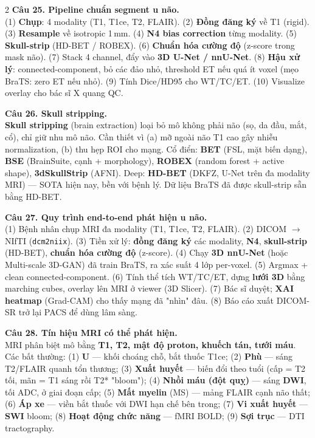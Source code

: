 \begin{paracol}{2}
\textbf{Câu 25. Pipeline chuẩn segment u não.}\\
(1) \textbf{Chụp}: 4 modality (T1, T1ce, T2, FLAIR). (2) \textbf{Đồng đăng ký} về T1 (rigid). (3) \textbf{Resample} về isotropic 1\,mm. (4) \textbf{N4 bias correction} từng modality. (5) \textbf{Skull-strip} (HD-BET / ROBEX). (6) \textbf{Chuẩn hóa cường độ} (z-score trong mask não). (7) Stack 4 channel, đẩy vào \textbf{3D U-Net / nnU-Net}. (8) \textbf{Hậu xử lý}: connected-component, bỏ các đảo nhỏ, threshold ET nếu quá ít voxel (mẹo BraTS: zero ET nếu nhỏ). (9) Tính Dice/HD95 cho WT/TC/ET. (10) Visualize overlay cho bác sĩ X quang QC.

\textbf{Câu 26. Skull stripping.}\\
\textbf{Skull stripping} (brain extraction) loại bỏ mô không phải não (sọ, da đầu, mắt, cổ), chỉ giữ nhu mô não. Cần thiết vì (a) mỡ ngoài não T1 cao gây nhiễu normalization, (b) thu hẹp ROI cho mạng. Cổ điển: \textbf{BET} (FSL, mặt biến dạng), \textbf{BSE} (BrainSuite, cạnh + morphology), \textbf{ROBEX} (random forest + active shape), \textbf{3dSkullStrip} (AFNI). Deep: \textbf{HD-BET} (DKFZ, U-Net trên đa modality MRI) — SOTA hiện nay, bền với bệnh lý. Dữ liệu BraTS đã được skull-strip sẵn bằng HD-BET.

\textbf{Câu 27. Quy trình end-to-end phát hiện u não.}\\
(1) Bệnh nhân chụp MRI đa modality (T1, T1ce, T2, FLAIR). (2) DICOM $\to$ NIfTI (\texttt{dcm2niix}). (3) Tiền xử lý: \textbf{đồng đăng ký} các modality, \textbf{N4}, \textbf{skull-strip} (HD-BET), \textbf{chuẩn hóa cường độ} (z-score). (4) Chạy \textbf{3D nnU-Net} (hoặc Multi-scale 3D-GAN) đã train BraTS, ra xác suất 4 lớp per-voxel. (5) Argmax + clean connected-component. (6) Tính thể tích WT/TC/ET, dựng \textbf{lưới 3D} bằng marching cubes, overlay lên MRI ở viewer (3D Slicer). (7) Bác sĩ duyệt; \textbf{XAI heatmap} (Grad-CAM) cho thấy mạng đã "nhìn" đâu. (8) Báo cáo xuất DICOM-SR trở lại PACS để dùng lâm sàng.

\textbf{Câu 28. Tín hiệu MRI có thể phát hiện.}\\
MRI phân biệt mô bằng \textbf{T1, T2, mật độ proton, khuếch tán, tưới máu}. Các bất thường: (1) \textbf{U} — khối choáng chỗ, bắt thuốc T1ce; (2) \textbf{Phù} — sáng T2/FLAIR quanh tổn thương; (3) \textbf{Xuất huyết} — biến đổi theo tuổi (cấp = T2 tối, mãn = T1 sáng rồi T2* "bloom"); (4) \textbf{Nhồi máu (đột quỵ)} — sáng \textbf{DWI}, tối ADC, ở giai đoạn cấp; (5) \textbf{Mất myelin} (MS) — mảng FLAIR cạnh não thất; (6) \textbf{Áp xe} — viền bắt thuốc với DWI hạn chế bên trong; (7) \textbf{Vi xuất huyết} — \textbf{SWI} bloom; (8) \textbf{Hoạt động chức năng} — fMRI BOLD; (9) \textbf{Sợi trục} — DTI tractography.


\end{paracol}
